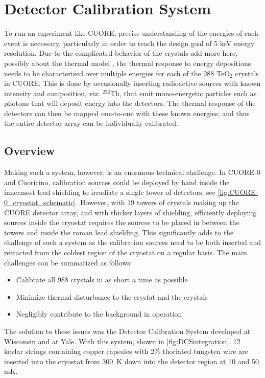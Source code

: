 \chapter{Detector Calibration System}

To run an experiment like CUORE, precise understanding of the energies of each event is necessary, particularly in order to reach the design goal of 5 keV energy resolution.
Due to the complicated behavior of the crystals \color{red} add more here, possibly about the thermal model \color{black}, the thermal response to energy depositions needs to be characterized over multiple energies for each of the 988 TeO$_2$ crystals in CUORE.
This is done by occasionally inserting radioactive sources with known intensity and composition, viz. $^{232}$Th, that emit mono-energetic particles such as photons that will deposit energy into the detectors.
The thermal response of the detectors can then be mapped one-to-one with these known energies, and thus the entire detector array can be individually calibrated.

\section{Overview}

Making such a system, however, is an enormous technical challenge.
In CUORE-0 and Cuoricino, calibration sources could be deployed by hand inside the innermost lead shielding to irradiate a single tower of detectors, see \autoref{fig:CUORE-0_cryostat_schematic}.
However, with 19 towers of crystals making up the CUORE detector array, and with thicker layers of shielding, efficiently deploying sources inside the cryostat requires the sources to be placed in between the towers and inside the roman lead shielding.
This significantly adds to the challenge of such a system as the calibration sources need to be both inserted and retracted from the coldest region of the cryostat on a regular basis.
The main challenges can be summarized as follows: 
\begin{itemize}
\item Calibrate all 988 crystals in as short a time as possible
\item Minimize thermal disturbance to the crystat and the crystals
\item Negligibly contribute to the background in operation
\end{itemize}

The solution to these issues was the Detector Calibration System developed at Wisconsin and at Yale.
With this system, shown in \autoref{fig:DCSintegration}, 12 kevlar strings containing copper capsules with 2\% thoriated tungsten wire are inserted into the cryostat from 300~K down into the detector region at 10 and 50 mK. 

